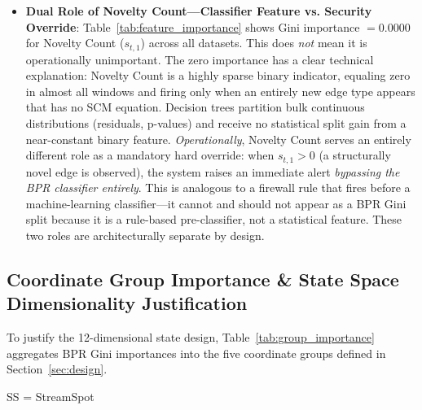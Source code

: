 \begin{itemize}
\item \textbf{Dual Role of Novelty Count---Classifier Feature vs. Security Override}: Table~\ref{tab:feature_importance} shows Gini importance $= 0.0000$ for Novelty Count ($s_{t,1}$) across all datasets. This does \emph{not} mean it is operationally unimportant. The zero importance has a clear technical explanation: Novelty Count is a highly sparse binary indicator, equaling zero in almost all windows and firing only when an entirely new edge type appears that has no SCM equation. Decision trees partition bulk continuous distributions (residuals, p-values) and receive no statistical split gain from a near-constant binary feature. \emph{Operationally}, Novelty Count serves an entirely different role as a mandatory hard override: when $s_{t,1} > 0$ (a structurally novel edge is observed), the system raises an immediate alert \emph{bypassing the BPR classifier entirely}. This is analogous to a firewall rule that fires before a machine-learning classifier---it cannot and should not appear as a BPR Gini split because it is a rule-based pre-classifier, not a statistical feature. These two roles are architecturally separate by design.
\end{itemize}

\subsection{Coordinate Group Importance \& State Space Dimensionality Justification}
\label{sec:dim_justification}
To justify the 12-dimensional state design, Table~\ref{tab:group_importance} aggregates BPR Gini importances into the five coordinate groups defined in Section~\ref{sec:design}.

\begin{table}[htbp]
\centering
\caption{Aggregate BPR importance by coordinate group (summed from Table~\ref{tab:feature_importance}). Columns sum to 1.0. No group is near-zero across all datasets, justifying all five groups.}
\newline\vspace{1pt}
\footnotesize{SS = StreamSpot}
\label{tab:group_importance}
\end{table}

